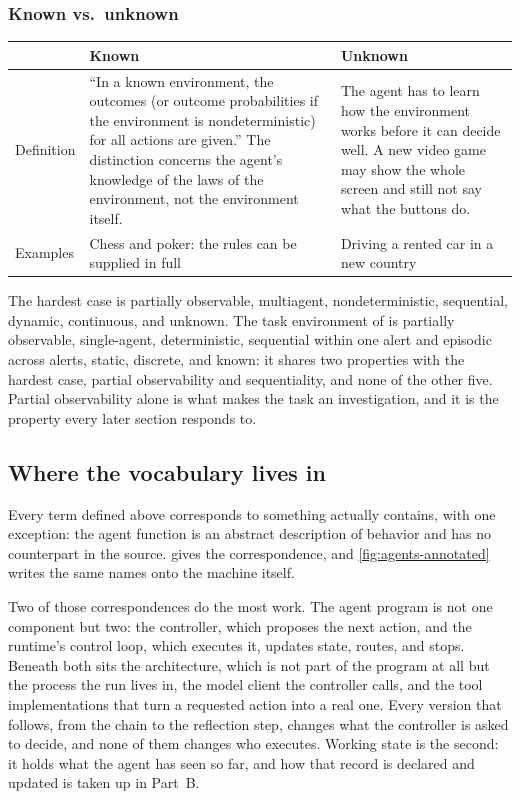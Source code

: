 \subsubsection{Known vs.\ unknown}
\begin{center}\small
\begin{tabularx}{\linewidth}{>{\RaggedRight}p{1.9cm}XX}
  \toprule
  & Known & Unknown \\
  \midrule
  Definition & ``In a known environment, the outcomes (or outcome probabilities if the environment is nondeterministic) for all actions are given.'' The distinction concerns the agent's knowledge of the laws of the environment, not the environment itself. & The agent has to learn how the environment works before it can decide well. A new video game may show the whole screen and still not say what the buttons do. \\
  Examples & Chess and poker: the rules can be supplied in full & Driving a rented car in a new country \\
  \bottomrule
\end{tabularx}
\end{center}

The hardest case \citep[\S2.3.2]{russell2020aima} is partially observable, multiagent,
nondeterministic, sequential, dynamic, continuous, and unknown. The task environment of \msa{} is
partially observable, single-agent, deterministic, sequential within one alert and episodic
across alerts, static, discrete, and known: it shares two properties with the hardest case,
partial observability and sequentiality, and none of the other five. Partial observability alone is what makes the task an
investigation, and it is the property every later section responds to.

\subsection{Where the vocabulary lives in \msa{}}
\label{sec:agents-mapping}

Every term defined above corresponds to something \msa{} actually contains, with one exception:
the agent function is an abstract description of behavior and has no counterpart in the source.
 gives the correspondence, and \cref{fig:agents-annotated} writes the
same names onto the machine itself.

Two of those correspondences do the most work. The agent program is not one component but two: the
controller, which proposes the next action, and the runtime's control loop, which executes it,
updates state, routes, and stops. Beneath both sits the architecture, which is not part of the
program at all but the process the run lives in, the model client the controller calls, and the
tool implementations that turn a requested action into a real one. Every version that follows,
from the chain to the reflection step, changes what the controller is asked to decide, and none of
them changes who executes. Working
state is the second: it holds what the agent has seen so far, and how that record is declared and
updated is taken up in Part~B.


